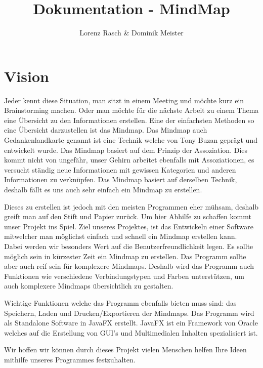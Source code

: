 \documentclass[a4paper,parskip]{scrartcl}
\title{Dokumentation - MindMap}
\author{Lorenz Rasch \& Dominik Meister}
\begin{document}
\maketitle
\tableofcontents
\pagebreak
\section{Vision}
Jeder kennt diese Situation, man sitzt in einem Meeting und möchte kurz ein Brainstorming machen. Oder man
möchte für die nächste Arbeit zu einem Thema eine Übersicht zu den Informationen erstellen. Eine der einfachsten Methoden so eine Übersicht darzustellen ist das Mindmap. Das Mindmap auch Gedankenlandkarte genannt ist eine Technik welche von Tony Buzan geprägt und entwickelt wurde. Das Mindmap basiert auf dem Prinzip der Assoziation. Dies kommt nicht von ungefähr, unser Gehirn arbeitet ebenfalls mit Assoziationen, es versucht ständig neue Informationen mit gewissen Kategorien und anderen Informationen zu verknüpfen. Das Mindmap basiert auf derselben Technik, deshalb fällt es uns auch sehr einfach ein Mindmap zu erstellen.

Dieses zu erstellen ist jedoch mit den meisten Programmen eher mühsam, deshalb greift man auf den Stift und Papier zurück. Um hier Abhilfe zu schaffen kommt unser Projekt ins Spiel. Ziel unseres Projektes, ist das Entwickeln einer Software mitwelcher man möglichst einfach und schnell ein Mindmap erstellen kann. \\
Dabei werden wir besonders Wert auf die Benutzerfreundlichkeit legen. Es sollte möglich sein in kürzester Zeit ein Mindmap zu erstellen. Das Programm sollte aber auch reif sein für komplexere Mindmaps. Deshalb wird das Programm auch Funktionen wie verschiedene Verbindungstypen und Farben unterstützen, um auch komplexere Mindmaps übersichtlich zu gestalten.

Wichtige Funktionen welche das Programm ebenfalls bieten muss sind: das Speichern, Laden und Drucken/Exportieren der Mindmaps. 
Das Programm wird als Standalone Software in JavaFX erstellt. JavaFX ist ein Framework von Oracle welches auf die Erstellung von GUI's und Multimedialen Inhalten spezialisiert ist.

Wir hoffen wir können durch dieses Projekt vielen Menschen helfen Ihre Ideen mithilfe unseres Programmes
festzuhalten.
\end{document}

